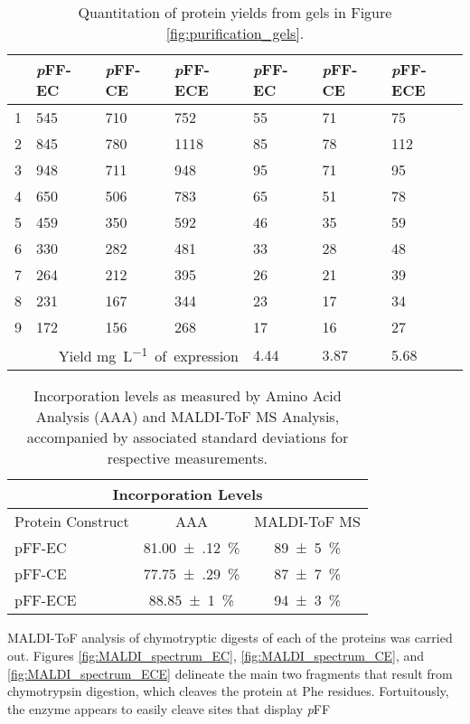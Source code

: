 \begin{refsection}
\begin{table}[h!]
\begin{tabular}{ lllllll }
  \hline
  &
  \emph{p}FF-EC &
  \emph{p}FF-CE &
  \emph{p}FF-ECE &
  \emph{p}FF-EC &
  \emph{p}FF-CE &
  \emph{p}FF-ECE \\ 
  \hline
  1 & 545 & 710 & 752 & 55 & 71 & 75 \\
  2 & 845 & 780 & 1118 & 85 & 78 & 112 \\
  3 & 948 & 711 & 948 & 95 & 71 & 95 \\
  4 & 650 & 506 & 783 & 65 & 51 & 78 \\
  5 & 459 & 350 & 592 & 46 & 35 & 59 \\
  6 & 330 & 282 & 481 & 33 & 28 & 48 \\
  7 & 264 & 212 & 395 & 26 & 21 & 39 \\
  8 & 231 & 167 & 344 & 23 & 17 & 34 \\
  9 & 172 & 156 & 268 & 17 & 16 & 27 \\
  \hline
  \multicolumn{4}{r}{Yield \si{\mg \per \L of expression}} & 4.44 & 3.87 & 5.68
\end{tabular}
\caption{Quantitation of protein yields from gels in Figure
    \ref{fig:purification_gels}.}
\label{tab:yield_analysis}
\end{table}
\begin{table}[h!]
    \centering
\begin{tabular}{lcc}
  \hline
  \multicolumn{3}{c}{Incorporation Levels} \\
  \hline
  Protein Construct & AAA & MALDI-ToF MS \\
  \hline
  pFF-EC & \SI{81.00(12)}{\percent} & \SI{89(5)}{\percent} \\
  pFF-CE & \SI{77.75(29)}{\percent} & \SI{87(7)}{\percent} \\
  pFF-ECE & \SI{88.85(100)}{\percent} & \SI{94(3)}{\percent} \\
  \hline
\end{tabular}
\caption{Incorporation levels as measured by Amino Acid Analysis (AAA) and
MALDI-ToF MS Analysis, accompanied by associated standard deviations for
respective measurements.}
\label{tab:incorporation_numbers}
\end{table}
MALDI-ToF analysis of chymotryptic digests of each of the proteins was carried
out. Figures \ref{fig:MALDI_spectrum_EC}, \ref{fig:MALDI_spectrum_CE}, and
\ref{fig:MALDI_spectrum_ECE} delineate the main two fragments that result from
chymotrypsin digestion, which cleaves the protein at Phe residues.
Fortuitously, the enzyme appears to easily cleave sites that display \emph{p}FF

\end{refsection}

